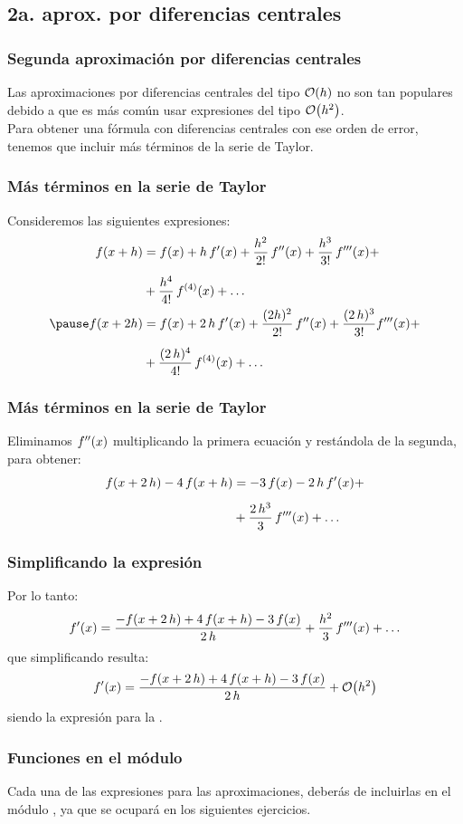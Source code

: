 \documentclass[12pt]{beamer}
\begin{document}
\subsection{2a. aprox. por diferencias centrales}

\begin{frame}
\frametitle{Segunda aproximación por diferencias centrales}
Las aproximaciones por diferencias centrales del tipo $\order{h}$ no son tan populares debido a que es más común usar expresiones del tipo $\order{h^{2}}$.
\\
\bigskip
\pause
Para obtener una fórmula con diferencias centrales con ese orden de error, tenemos que incluir más términos de la serie de Taylor.
\end{frame}
\begin{frame}
\frametitle{Más términos en la serie de Taylor}
Consideremos las siguientes expresiones:
\pause
\begin{eqnarray*}
\begin{aligned}
f (x + h) &= f (x) + h \, \pderivada{f} (x) + \dfrac{h^{2}}{2!} \, \sderivada{f} (x) + \dfrac{h^{3}}{3!} \, \tderivada{f} (x) + \\[0.5em]
&+ \dfrac{h^{4}}{4!} \, f^{(4)} (x) + \ldots \\ \pause
f (x + 2 h) &= f (x) + 2 \, h \, \pderivada{f} (x) + \dfrac{(2 h)^{2}}{2!} \, \sderivada{f} (x) + \dfrac{(2 \, h)^{3}}{3!} \tderivada{f} (x) + \\[0.5em]
&+ \dfrac{(2 \, h)^{4}}{4!} \, f^{(4)}(x) + \ldots
\end{aligned}
\end{eqnarray*}
\end{frame}
\begin{frame}
\frametitle{Más términos en la serie de Taylor}
Eliminamos ${f}^{\prime \prime} (x)$ multiplicando la primera ecuación y restándola de la segunda, para obtener:
\pause
\begin{align*}
f (x + 2 \, h) - 4 \, f (x + h) &= -3 \, f (x) - 2 \, h \, {f}^{\prime} (x) + \\[0.5em]
&+ \dfrac{2 \, h^{3}}{3} \, {f}^{\prime \prime \prime} (x) + \ldots
\end{align*}
\end{frame}
\begin{frame}
\frametitle{Simplificando la expresión}
Por lo tanto:
\pause
\begin{align*}
{f}^{\prime} (x) = \dfrac{-f (x + 2 \, h) + 4 \, f(x + h) - 3 \, f (x)}{2 \, h} + \dfrac{h^{2}}{3} \, {f}^{\prime \prime \prime} (x) + \ldots
\end{align*}
que simplificando resulta:
\pause
\begin{align*}
\pderivada{f} (x) = \dfrac{- f (x + 2 \, h) + 4 \, f (x + h) - 3 \, f (x)}{2 \, h} + \order{h^{2}}
\end{align*}
siendo la expresión para la .
\end{frame}
\begin{frame}
\frametitle{Funciones en el módulo}
Cada una de las expresiones para las aproximaciones, deberás de incluirlas en el módulo , ya que se ocupará en los siguientes ejercicios.
\end{frame}
\end{document}
